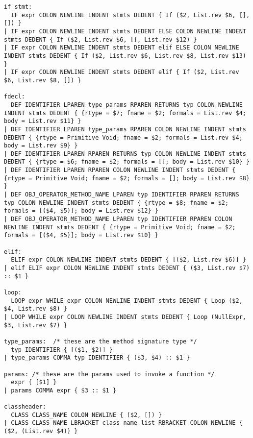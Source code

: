 \documentclass{article}
\begin{document}
\begin{verbatim}
if_stmt:
  IF expr COLON NEWLINE INDENT stmts DEDENT { If ($2, List.rev $6, [], []) }
| IF expr COLON NEWLINE INDENT stmts DEDENT ELSE COLON NEWLINE INDENT stmts DEDENT { If ($2, List.rev $6, [], List.rev $12) }
| IF expr COLON NEWLINE INDENT stmts DEDENT elif ELSE COLON NEWLINE INDENT stmts DEDENT { If ($2, List.rev $6, List.rev $8, List.rev $13) }
| IF expr COLON NEWLINE INDENT stmts DEDENT elif { If ($2, List.rev $6, List.rev $8, []) }

fdecl:
  DEF IDENTIFIER LPAREN type_params RPAREN RETURNS typ COLON NEWLINE INDENT stmts DEDENT { {rtype = $7; fname = $2; formals = List.rev $4; body = List.rev $11} }
| DEF IDENTIFIER LPAREN type_params RPAREN COLON NEWLINE INDENT stmts DEDENT { {rtype = Primitive Void; fname = $2; formals = List.rev $4; body = List.rev $9} }
| DEF IDENTIFIER LPAREN RPAREN RETURNS typ COLON NEWLINE INDENT stmts DEDENT { {rtype = $6; fname = $2; formals = []; body = List.rev $10} }
| DEF IDENTIFIER LPAREN RPAREN COLON NEWLINE INDENT stmts DEDENT { {rtype = Primitive Void; fname = $2; formals = []; body = List.rev $8} }
| DEF OBJ_OPERATOR_METHOD_NAME LPAREN typ IDENTIFIER RPAREN RETURNS typ COLON NEWLINE INDENT stmts DEDENT { {rtype = $8; fname = $2; formals = [($4, $5)]; body = List.rev $12} }
| DEF OBJ_OPERATOR_METHOD_NAME LPAREN typ IDENTIFIER RPAREN COLON NEWLINE INDENT stmts DEDENT { {rtype = Primitive Void; fname = $2; formals = [($4, $5)]; body = List.rev $10} }

elif:
  ELIF expr COLON NEWLINE INDENT stmts DEDENT { [($2, List.rev $6)] }
| elif ELIF expr COLON NEWLINE INDENT stmts DEDENT { ($3, List.rev $7) :: $1 }

loop:
  LOOP expr WHILE expr COLON NEWLINE INDENT stmts DEDENT { Loop ($2, $4, List.rev $8) }
| LOOP WHILE expr COLON NEWLINE INDENT stmts DEDENT { Loop (NullExpr, $3, List.rev $7) }

type_params:  /* these are the method signature type */
  typ IDENTIFIER { [($1, $2)] }
| type_params COMMA typ IDENTIFIER { ($3, $4) :: $1 }

params: /* these are the params used to invoke a function */
  expr { [$1] }
| params COMMA expr { $3 :: $1 }

classheader:
  CLASS CLASS_NAME COLON NEWLINE { ($2, []) }
| CLASS CLASS_NAME LBRACKET class_name_list RBRACKET COLON NEWLINE { ($2, (List.rev $4)) }


\end{verbatim}
\end{document}
